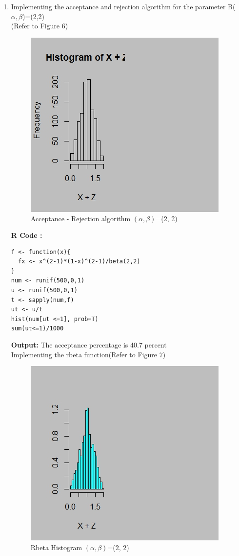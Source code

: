 \documentclass[letterpaper]{article}
\begin{document}
\begin{enumerate}
\begin{enumerate}
\item Implementing the acceptance and rejection algorithm for the parameter B($\alpha,\beta$)=(2,2)\\(Refer to Figure 6)
\begin{figure}[h]
     \centering
      \includegraphics[scale=0.5]{fig2.jpeg}
       \caption{ Acceptance - Rejection algorithm $(\alpha,\beta)$=(2, 2) \label{overflow}}
         \label{Figure 6}
\end{figure}


\textbf {R Code :}\\
\begin{verbatim}
f <- function(x){
  fx <- x^(2-1)*(1-x)^(2-1)/beta(2,2)
}
num <- runif(500,0,1)
u <- runif(500,0,1)
t <- sapply(num,f)
ut <- u/t
hist(num[ut <=1], prob=T)
sum(ut<=1)/1000
\end{verbatim}

\textbf {Output:} The acceptance percentage is 40.7 percent\\

Implementing the rbeta function(Refer to Figure 7)
\begin{figure}[h]
      \centering
       \includegraphics[scale=0.5]{fig3.jpeg}
        \caption{ Rbeta Histogram $(\alpha,\beta)$=(2, 2) \label{overflow}}
         \label{Figure 7}
\end{figure}


\end{enumerate}
\end{enumerate}
\end{document}
